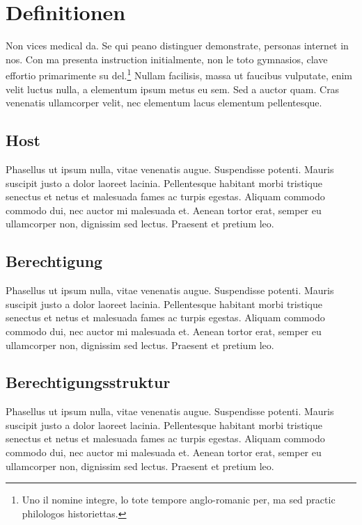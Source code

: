 \chapter{Definitionen}
\label{ch:chapter02}
Non vices medical da. Se qui peano distinguer demonstrate, personas internet in nos. Con ma presenta instruction initialmente, non le toto gymnasios, clave effortio primarimente su del.\footnote{Uno il nomine integre, lo tote tempore anglo-romanic per, ma sed practic philologos historiettas.} Nullam facilisis, massa ut faucibus vulputate, enim velit luctus nulla, a elementum ipsum metus eu sem. Sed a auctor quam. Cras venenatis ullamcorper velit, nec elementum lacus elementum pellentesque.

%
%
\section{Host}
\label{sec:background:Berechtigung}
Phasellus ut ipsum nulla, vitae venenatis augue. Suspendisse potenti. Mauris suscipit justo a dolor laoreet lacinia. Pellentesque habitant morbi tristique senectus et netus et malesuada fames ac turpis egestas. Aliquam commodo commodo dui, nec auctor mi malesuada et. Aenean tortor erat, semper eu ullamcorper non, dignissim sed lectus. Praesent et pretium leo.

\section{Berechtigung}
\label{sec:background:Berechtigung}
Phasellus ut ipsum nulla, vitae venenatis augue. Suspendisse potenti. Mauris suscipit justo a dolor laoreet lacinia. Pellentesque habitant morbi tristique senectus et netus et malesuada fames ac turpis egestas. Aliquam commodo commodo dui, nec auctor mi malesuada et. Aenean tortor erat, semper eu ullamcorper non, dignissim sed lectus. Praesent et pretium leo.

\section{Berechtigungsstruktur}
\label{sec:background:Berechtigungsstruktur}
Phasellus ut ipsum nulla, vitae venenatis augue. Suspendisse potenti. Mauris suscipit justo a dolor laoreet lacinia. Pellentesque habitant morbi tristique senectus et netus et malesuada fames ac turpis egestas. Aliquam commodo commodo dui, nec auctor mi malesuada et. Aenean tortor erat, semper eu ullamcorper non, dignissim sed lectus. Praesent et pretium leo.

